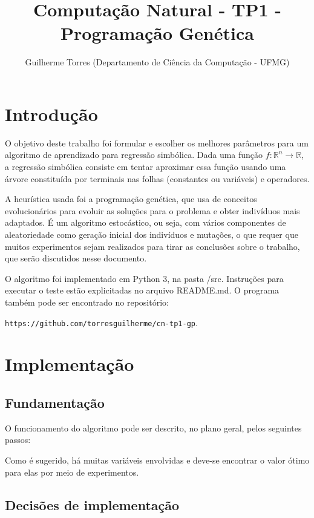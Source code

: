 \documentclass[11pt]{article}
\begin{document}
\title{Computação Natural - TP1 - Programação Genética}
\author{Guilherme Torres (Departamento de Ciência da Computação - UFMG)}
\date{}
\maketitle

\section{Introdução}

O objetivo deste trabalho foi formular e escolher os melhores parâmetros para um algoritmo de aprendizado para regressão simbólica. Dada uma função $f: \mathbb{R}^n \to \mathbb{R}$, a regressão simbólica consiste em tentar aproximar essa função usando uma árvore constituída por terminais nas folhas (constantes ou variáveis) e operadores.

A heurística usada foi a programação genética, que usa de conceitos evolucionários para evoluir as soluções para o problema e obter indivíduos mais adaptados. É um algoritmo estocástico, ou seja, com vários componentes de aleatoriedade como geração inicial dos indivíduos e mutações, o que requer que muitos experimentos sejam realizados para tirar as conclusões sobre o trabalho, que serão discutidos nesse documento.

O algoritmo foi implementado em Python 3, na pasta /src. Instruções para executar o teste estão explicitadas no arquivo README.md. O programa também pode ser encontrado no repositório:

\texttt{https://github.com/torresguilherme/cn-tp1-gp}.

\section{Implementação}

\subsection{Fundamentação}

O funcionamento do algoritmo pode ser descrito, no plano geral, pelos seguintes passos:

Como é sugerido, há muitas variáveis envolvidas e deve-se encontrar o valor ótimo para elas por meio de experimentos.

\subsection{Decisões de implementação}
\end{document}
